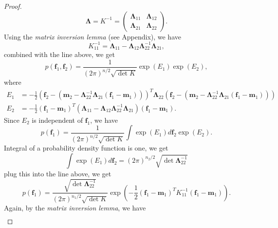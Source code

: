 \documentclass[11pt,a4paper]{article}
\theoremstyle{definition}
\numberwithin{equation}{section}
\let\vec\mathbf
\begin{document}
\begin{proof}
\begin{equation*}
		\vec \Lambda = K^{-1} = 
		\begin{pmatrix}
		\vec\Lambda_{11} & \vec\Lambda_{12}\\
		\vec\Lambda_{21} & \vec\Lambda_{22}
		\end{pmatrix}.
		\end{equation*}
		Using the \textit{matrix inversion lemma} (see Appendix), we have
		\begin{equation*} \label{}
		K_{11}^{-1} = \vec\Lambda_{11}-\vec\Lambda_{12}\vec\Lambda_{22}^{-1}\vec\Lambda_{21},
		\end{equation*}
		combined with the line above, we get
		\begin{equation*} \label{}
		p(\vec f_1,\vec f_2) = \frac{1}{(2\pi)^{n/2}\sqrt{\det K}}\exp{(E_1)}\exp{(E_2)},
		\end{equation*}
		where
		\begin{equation*} \label{}
		\begin{split}
		E_1 &=-\frac{1}{2}\left(\vec f_2-(\vec m_2 - \vec\Lambda_{22}^{-1} \vec\Lambda_{21}(\vec f_1 - \vec m_1))\right)^T\vec\Lambda_{22}\left(\vec f_2-(\vec m_2 - \vec\Lambda_{22}^{-1} \vec\Lambda_{21}(\vec f_1 - \vec m_1))\right)\\
		E_2 & = -\frac{1}{2}\left(\vec f_1 - \vec m_1\right)^T\left(\vec\Lambda_{11}-\vec\Lambda_{12}\vec\Lambda_{22}^{-1}\vec\Lambda_{21}\right)\left(\vec f_1 - \vec m _1 \right).
		\end{split}
		\end{equation*}
		Since $E_2$ is independent of $\vec f_1$, we have
		\begin{equation*} \label{}
		p(\vec f_1) = \frac{1}{(2\pi)^{n/2}\sqrt{\det K}}\int \exp{(E_1)}d\vec f_2\exp{(E_2)}.
		\end{equation*}
		Integral of a probability density function is one, we get
		\begin{equation*} \label{}
		\int \exp{(E_1)}d\vec f_2 = (2\pi)^{n_2/2}\sqrt{\det \vec \Lambda_{22}^{-1}}
		\end{equation*}
		plug this into the line above, we get
		\begin{equation*} \label{}
		p(\vec f_1) = \frac{\sqrt{\det \vec \Lambda_{22}^{-1}}}{(2\pi)^{n_1/2}\sqrt{\det K}} \exp{\left(-\frac{1}{2}\left(\vec f_1 - \vec m_1\right)^TK_{11}^{-1}\left(\vec f_1 - \vec m _1 \right)\right)}.
		\end{equation*}
		Again, by the \textit{matrix inversion lemma}, we have
		\begin{equation*} \label{}
		\begin{split}

\end{split}
\end{equation*}
\end{proof}
\end{document}
